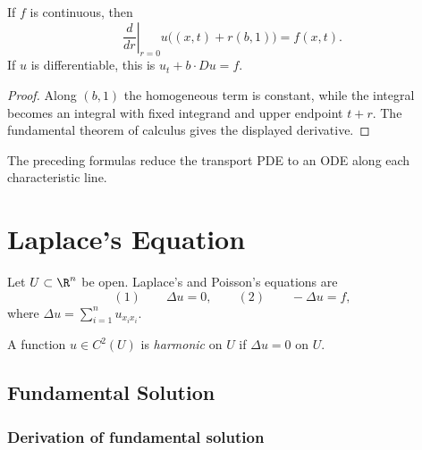 \begin{theorem}
\label{thm:transport-nonhom-solves}
\leanok
If $f$ is continuous, then
$$\left.\frac{d}{dr}\right|_{r=0}u\bigl((x,t)+r(b,1)\bigr)=f(x,t).$$
If $u$ is differentiable, this is $u_t+b\cdot Du=f$.
\end{theorem}
\begin{proof}
\leanok
\sketch Along $(b,1)$ the homogeneous term is constant, while the integral
becomes an integral with fixed integrand and upper endpoint $t+r$. The
fundamental theorem of calculus gives the displayed derivative.
\end{proof}

\begin{remark}
\label{rem:transport-equation-method-of-characteristics}
The preceding formulas reduce the transport PDE to an ODE along each
characteristic line.
\end{remark}

\section{Laplace's Equation}
\label{sec:laplaces-equation}

Let $U\subset\R^n$ be open. Laplace's and Poisson's equations are
$$(1)\qquad \Delta u=0,
\qquad
(2)\qquad -\Delta u=f,$$
where $\Delta u=\sum_{i=1}^n u_{x_i x_i}$.

\begin{definition}
\label{def:harmonic-function}
\mathlibok
A function $u\in C^2(U)$ is \emph{harmonic} on $U$ if $\Delta u=0$ on $U$.
\end{definition}

\subsection{Fundamental Solution}
\label{sec:laplace-fundamental-solution}

\subsubsection{Derivation of fundamental solution}
\label{sec:laplace-fundamental-solution-derivation}

